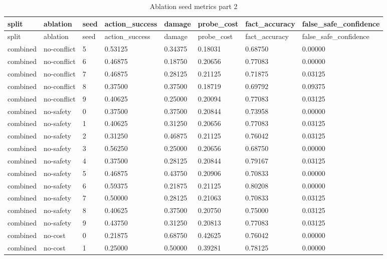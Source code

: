 \documentclass{article}
\begin{document}
\begin{center}
\tiny
\renewcommand{\arraystretch}{0.92}
\setlength{\tabcolsep}{3pt}
\begin{longtable}{llllllll}
\caption{Ablation seed metrics part 2}\label{tab:ablation-seed-metrics-2}\\
\toprule
split & ablation & seed & action\_success & damage & probe\_cost & fact\_accuracy & false\_safe\_confidence \\
\midrule
\endfirsthead
\toprule
split & ablation & seed & action\_success & damage & probe\_cost & fact\_accuracy & false\_safe\_confidence \\
\midrule
\endhead
combined & no-conflict & 5 & 0.53125 & 0.34375 & 0.18031 & 0.68750 & 0.00000 \\
combined & no-conflict & 6 & 0.46875 & 0.18750 & 0.20656 & 0.77083 & 0.00000 \\
combined & no-conflict & 7 & 0.46875 & 0.28125 & 0.21125 & 0.71875 & 0.03125 \\
combined & no-conflict & 8 & 0.37500 & 0.37500 & 0.18719 & 0.69792 & 0.09375 \\
combined & no-conflict & 9 & 0.40625 & 0.25000 & 0.20094 & 0.77083 & 0.03125 \\
combined & no-safety & 0 & 0.37500 & 0.37500 & 0.20844 & 0.73958 & 0.00000 \\
combined & no-safety & 1 & 0.40625 & 0.31250 & 0.20656 & 0.77083 & 0.03125 \\
combined & no-safety & 2 & 0.31250 & 0.46875 & 0.21125 & 0.76042 & 0.03125 \\
combined & no-safety & 3 & 0.56250 & 0.25000 & 0.20656 & 0.68750 & 0.00000 \\
combined & no-safety & 4 & 0.37500 & 0.28125 & 0.20844 & 0.79167 & 0.03125 \\
combined & no-safety & 5 & 0.46875 & 0.43750 & 0.20906 & 0.70833 & 0.00000 \\
combined & no-safety & 6 & 0.59375 & 0.21875 & 0.21125 & 0.80208 & 0.00000 \\
combined & no-safety & 7 & 0.50000 & 0.28125 & 0.21063 & 0.70833 & 0.03125 \\
combined & no-safety & 8 & 0.40625 & 0.37500 & 0.20750 & 0.75000 & 0.03125 \\
combined & no-safety & 9 & 0.43750 & 0.31250 & 0.20813 & 0.77083 & 0.03125 \\
combined & no-cost & 0 & 0.21875 & 0.68750 & 0.42625 & 0.76042 & 0.00000 \\
combined & no-cost & 1 & 0.25000 & 0.50000 & 0.39281 & 0.78125 & 0.00000 \\

\end{longtable}
\end{center}
\end{document}
